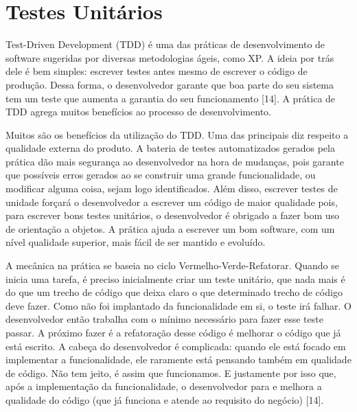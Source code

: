 \section{Testes Unitários}

Test-Driven Development (TDD) é uma das práticas de desenvolvimento de software sugeridas por diversas metodologias ágeis, como XP. A ideia por trás dele é bem simples: escrever testes antes mesmo de escrever o código de produção. Dessa forma, o desenvolvedor garante que boa parte do seu sistema tem um teste que aumenta a garantia do seu funcionamento [14]. A prática de TDD agrega muitos benefícios ao processo de desenvolvimento.

Muitos são os benefícios da utilização do TDD. Uma das principais diz respeito a qualidade externa do produto. A bateria de testes automatizados gerados pela prática dão mais segurança ao desenvolvedor na hora de mudanças, pois garante que possíveis erros gerados ao se construir uma grande funcionalidade, ou modificar alguma coisa, sejam logo identificados. Além disso, escrever testes de unidade forçará o desenvolvedor a escrever um código de maior qualidade pois, para escrever bons testes unitários, o desenvolvedor é obrigado a fazer bom uso de orientação a objetos. A prática ajuda a escrever um bom software, com um nível qualidade superior, mais fácil de ser mantido e evoluído.

A mecânica na prática se baseia no ciclo Vermelho-Verde-Refatorar. Quando se inicia uma tarefa, é preciso inicialmente criar um teste unitário, que nada mais é do que um trecho de código que deixa claro o que determinado trecho de código deve fazer. Como não foi implantado da funcionalidade em si, o teste irá falhar. O desenvolvedor então trabalha com o mínimo necessário para fazer esse teste passar. A próximo fazer é a refatoração desse código é melhorar o código que já está escrito. A cabeça do desenvolvedor é complicada: quando ele está focado em implementar a funcionalidade, ele raramente está pensando também em qualidade de código. Não tem jeito, é assim que funcionamos. E justamente por isso que, após a implementação da funcionalidade, o desenvolvedor para e melhora a qualidade do código (que já funciona e atende ao requisito do negócio) [14].


